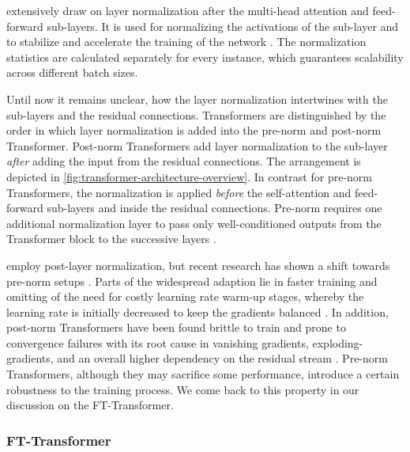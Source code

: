 \textcite[][6003]{vaswaniAttentionAllYou2017} extensively draw on layer normalization \autocite[][4]{baLayerNormalization2016} after the multi-head attention and feed-forward sub-layers. It is used for normalizing the activations of the sub-layer and to stabilize and accelerate the training of the network \autocite[][2]{baLayerNormalization2016}. The normalization statistics are calculated separately for every instance, which guarantees scalability across different batch sizes.

Until now it remains unclear, how the layer normalization intertwines with the sub-layers and the residual connections. Transformers are distinguished by the order in which layer normalization is added into the pre-norm and post-norm Transformer. Post-norm Transformers add layer normalization to the sub-layer \emph{after} adding the input from the residual connections. The arrangement is depicted in \cref{fig:transformer-architecture-overview}. In contrast for pre-norm Transformers, the normalization is applied \emph{before} the self-attention and feed-forward sub-layers and inside the residual connections. Pre-norm requires one additional normalization layer to pass only well-conditioned outputs from the Transformer block to the successive layers \autocite[][10528]{xiongLayerNormalizationTransformer2020}.

\textcite[][6003]{vaswaniAttentionAllYou2017} employ post-layer normalization, but recent research has shown a shift towards pre-norm setups \autocite[][4]{narangTransformerModificationsTransfer2021}. Parts of the widespread adaption lie in faster training and omitting of the need for costly learning rate warm-up stages, whereby the learning rate is initially decreased to keep the gradients balanced \autocites[][10525]{xiongLayerNormalizationTransformer2020}[][5754]{liuUnderstandingDifficultyTraining2020}. In addition, post-norm Transformers have been found brittle to train and prone to convergence failures with its root cause in vanishing gradients, \glspl{exploding-gradient}, and an overall higher dependency on the residual stream \autocites[][5751]{liuUnderstandingDifficultyTraining2020}[][1812]{wangLearningDeepTransformer2019}. Pre-norm Transformers, although they may sacrifice some performance, introduce a certain robustness to the training process. We come back to this property in our discussion on the FT-Transformer.

\subsubsection{FT-Transformer}\label{sec:fttransformer}

